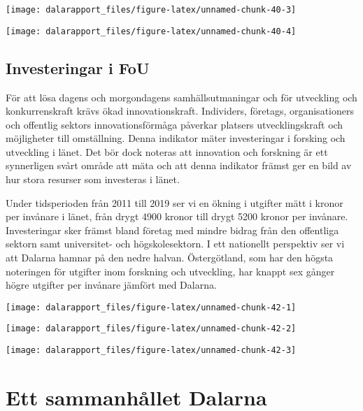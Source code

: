 \documentclass[
]{article}
\begin{document}
\begin{center}\texttt{[image: dalarapport\_files/figure-latex/unnamed-chunk-40-3]} \end{center}

\begin{center}\texttt{[image: dalarapport\_files/figure-latex/unnamed-chunk-40-4]} \end{center}

\hypertarget{investeringar-i-fou}{%
\subsection{Investeringar i FoU}\label{investeringar-i-fou}}

För att lösa dagens och morgondagens samhällsutmaningar och för
utveckling och konkurrenskraft krävs ökad innovationskraft. Individers,
företags, organisationers och offentlig sektors innovationsförmåga
påverkar platsers utvecklingskraft och möjligheter till omställning.
Denna indikator mäter investeringar i forsking och utveckling i länet.
Det bör dock noteras att innovation och forskning är ett synnerligen
svårt område att mäta och att denna indikator främst ger en bild av hur
stora resurser som investeras i länet.

Under tidsperioden från 2011 till 2019 ser vi en ökning i utgifter mätt
i kronor per invånare i länet, från drygt 4900 kronor till drygt 5200
kronor per invånare. Investeringar sker främst bland företag med mindre
bidrag från den offentliga sektorn samt universitet- och
högskolesektorn. I ett nationellt perspektiv ser vi att Dalarna hamnar
på den nedre halvan. Östergötland, som har den högsta noteringen för
utgifter inom forskning och utveckling, har knappt sex gånger högre
utgifter per invånare jämfört med Dalarna.

\begin{center}\texttt{[image: dalarapport\_files/figure-latex/unnamed-chunk-42-1]} \end{center}

\begin{center}\texttt{[image: dalarapport\_files/figure-latex/unnamed-chunk-42-2]} \end{center}

\begin{center}\texttt{[image: dalarapport\_files/figure-latex/unnamed-chunk-42-3]} \end{center}

\hypertarget{ett-sammanhuxe5llet-dalarna}{%
\section{Ett sammanhållet Dalarna}\label{ett-sammanhuxe5llet-dalarna}}
\end{document}
